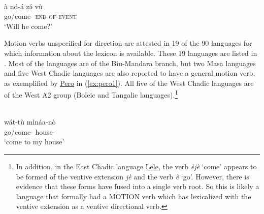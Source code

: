\ex\label{ex:mina4}
 \\
\gll  à	nd-á	zə́	vù \\
	go/come-	\textsc{end-of-event}	 \\
\glt `Will he come?'
\z 

Motion verbs unspecified for direction are attested in 19 of the 90 languages for which information about the lexicon is available. These 19 languages are listed in . Most of the languages are of the Biu-Mandara branch, but two Masa languages and five West Chadic languages are also reported to have a general motion verb, as exemplified by \hyperref[pero]{Pero} in (\ref{ex:pero1}). All five of the West Chadic languages are of the West A2 group (Boleic and Tangalic languages).\footnote{In addition, in the East Chadic language \hyperref[lele]{Lele}, the verb \textit{èjè} `come' appears to be formed of the ventive extension \textit{jè} and the verb \textit{è} `go'. However, there is evidence that these forms have fused into a single verb root. So this is likely a language that formally had a MOTION verb which has lexicalized with the ventive extension as a ventive directional verb.}

\ea\label{ex:pero1}
 \\
\gll  wát-tù	mìnáa-nò \\
go/come-	house- \\
\glt `come to my house'
\z

